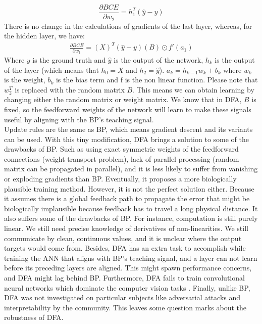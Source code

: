 \documentclass[a4paper, nobind]{templates/ociamthesis}
\begin{document}
\[
\frac{\partial BCE}{\partial w_{2}}=h_{1}^T\left(\hat{y}-y\right)
\]
There is no change in the calculations of gradients of the last layer, whereas, for the hidden layer, we have:
\[
\begin{aligned}
\frac{\partial BCE}{\partial w_{1}}= \left(X\right)^T\left(\hat{y}-y\right)\left(B\right) \odot f'(a_1)
\end{aligned}
\]
Where \(y\) is the ground truth and \(\hat{y}\) is the output of the network, \(h_k\) is the output of the layer (which means that \(h_0 = X\) and \(h_2 = \hat{y}\)). \(a_{k} = h_{k-1} w_{k} + b_k\) where \(w_k\) is the weight, \(b_{k}\) is the bias term and f is the non linear function.
Please note that \(w_2^T\) is replaced with the random matrix \(B\). This means we can obtain learning by changing either the random matrix or weight matrix. We know that in DFA, \(B\) is fixed, so the feedforward weights of the network will learn to make these signals useful by aligning with the BP's teaching signal.\\
Update rules are the same as BP, which means gradient descent and its variants can be used. With this tiny modification, DFA brings a solution to some of the drawbacks of BP. Such as using exact symmetric weights of the feedforward connections (weight transport problem), lack of parallel processing (random matrix can be propagated in parallel), and it is less likely to suffer from vanishing or exploding gradients than BP. Eventually, it proposes a more biologically plausible training method. However, it is not the perfect solution either. Because it assumes there is a global feedback path to propagate the error that might be biologically implausible because feedback has to travel a long physical distance. It also suffers some of the drawbacks of BP. For instance, computation is still purely linear. We still need precise knowledge of derivatives of non-linearities. We still communicate by clean, continuous values, and it is unclear where the output targets would come from. Besides, DFA has an extra task to accomplish while training the ANN that aligns with BP's teaching signal, and a layer can not learn before its preceding layers are aligned. This might spawn performance concerns, and DFA might lag behind BP.
Furthermore, DFA fails to train convolutional neural networks which dominate the computer vision tasks \cite{refinetti2021align, launay2019principled}. Finally, unlike BP, DFA was not investigated on particular subjects like adversarial attacks and interpretability by the community. This leaves some question marks about the robustness of DFA.
\end{document}
